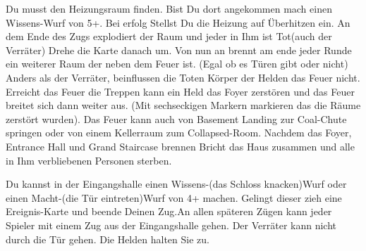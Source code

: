 





Du musst den Heizungsraum finden. Bist Du dort angekommen mach einen Wissens-Wurf von 5+.
Bei erfolg Stellst Du die Heizung auf Überhitzen ein.
An dem Ende des Zugs explodiert der Raum und jeder in Ihm ist Tot(auch der Verräter)
Drehe die Karte danach um.
Von nun an brennt am ende jeder Runde ein weiterer Raum der neben dem Feuer ist.
(Egal ob es Türen gibt oder nicht)
Anders als der Verräter, beinflussen die Toten Körper der Helden das Feuer nicht.
Erreicht das Feuer die Treppen kann ein Held das Foyer zerstören und das Feuer breitet sich dann weiter aus.
(Mit sechseckigen Markern markieren das die Räume zerstört wurden).
Das Feuer kann auch von Basement Landing zur Coal-Chute springen oder von einem Kellerraum zum Collapsed-Room.
Nachdem das Foyer, Entrance Hall und Grand Staircase brennen Bricht das Haus zusammen und alle in Ihm verbliebenen Personen sterben.

Du kannst in der Eingangshalle einen Wissens-(das Schloss knacken)Wurf oder einen Macht-(die Tür eintreten)Wurf von 4+ machen. Gelingt dieser zieh eine Ereignis-Karte und beende Deinen Zug.An allen späteren Zügen kann jeder Spieler mit einem Zug aus der Eingangshalle gehen.
Der Verräter kann nicht durch die Tür gehen. Die Helden halten Sie zu.



